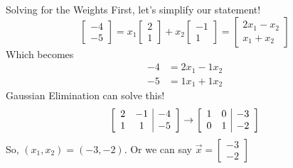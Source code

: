 \documentclass[xcoler=dvipsnames, aspectratio=169]{beamer}
\begin{document}
    \begin{frame}{Solving for the Weights}
        \small
        First, let's simplify our statement!
        \[
            \begin{bmatrix}
                -4\\-5
            \end{bmatrix} = x_1\begin{bmatrix}
                2\\1
            \end{bmatrix} + x_2\begin{bmatrix}
                -1\\1
            \end{bmatrix} = \begin{bmatrix}
                2x_1 - x_2\\
                x_1 + x_2
            \end{bmatrix}
        \]
        \pause
        Which becomes
        \begin{align*}
            -4 &= 2x_1 - 1x_2\\
            -5 &= 1x_1 + 1x_2
        \end{align*}
        \pause
        Gaussian Elimination can solve this!
        \[
            \aMat{cc|c}{
                2 & -1 & -4\\
                1 & 1 & -5
            }\rightarrow\aMat{cc|c}{
                1 & 0 & -3\\
                0 & 1 & -2
            }
        \]
        So, $(x_1,x_2) = (-3,-2)$. Or we can say
        $
            \vec{x} = \begin{bmatrix}
                -3\\-2
            \end{bmatrix}
        $
    \end{frame}
\end{document}
